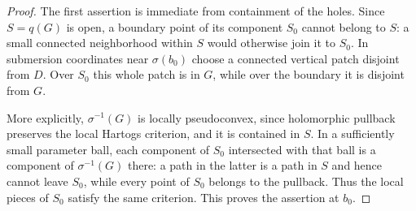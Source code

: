 \begin{proof}
The first assertion is immediate from containment of the holes. Since $S=q(G)$ is open, a boundary point of its component $S_0$ cannot belong to $S$: a small connected neighborhood within $S$ would otherwise join it to $S_0$. In submersion coordinates near $\sigma(b_0)$ choose a connected vertical patch disjoint from $D$. Over $S_0$ this whole patch is in $G$, while over the boundary it is disjoint from $G$.

More explicitly, $\sigma^{-1}(G)$ is locally pseudoconvex, since holomorphic pullback preserves the local Hartogs criterion, and it is contained in $S$. In a sufficiently small parameter ball, each component of $S_0$ intersected with that ball is a component of $\sigma^{-1}(G)$ there: a path in the latter is a path in $S$ and hence cannot leave $S_0$, while every point of $S_0$ belongs to the pullback. Thus the local pieces of $S_0$ satisfy the same criterion. This proves the assertion at $b_0$.
\end{proof}
